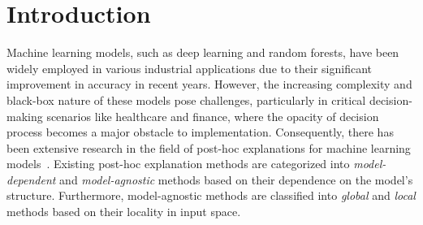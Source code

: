 \documentclass[11pt]{article}
\begin{document}
\section{Introduction}
Machine learning models, such as deep learning and random forests,
have been widely employed in various industrial applications
due to their significant improvement in accuracy in recent years.
However,
the increasing complexity and black-box nature of these models pose challenges,
particularly in critical decision-making scenarios like healthcare and finance,
where the opacity of decision process becomes a major obstacle to
implementation.
Consequently,
there has been extensive research in the field of post-hoc explanations
for machine learning models~\cite{%
  guidotti2018local,radulovic2023bella,ribeiro2016why,ribeiro2018anchors}.
Existing post-hoc explanation methods are categorized
into \emph{model-dependent} and \emph{model-agnostic} methods
based on their dependence on the model's structure.
Furthermore, model-agnostic methods are classified into
\emph{global} and \emph{local} methods based on their locality in input space.
\end{document}
